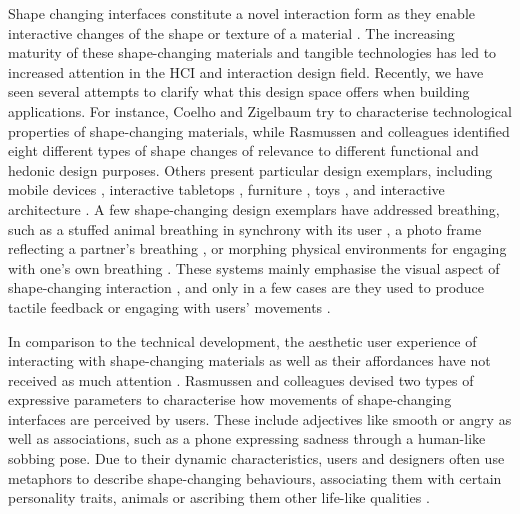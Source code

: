 Shape changing interfaces constitute a novel interaction form as they enable interactive changes of the shape or texture of a material \cite{alexander_grand_2018}. The increasing maturity of these shape-changing materials and tangible technologies has led to increased attention in the HCI and interaction design field. Recently, we have seen several attempts to clarify what this design space offers when building applications. For instance, Coelho and Zigelbaum \cite{coelho_shape-changing_2011} try to characterise technological properties of shape-changing materials, while Rasmussen and colleagues \cite{rasmussen_shape-changing_2012} identified eight different types of shape changes of relevance to different functional and hedonic design purposes. Others present particular design exemplars, including mobile devices \cite{hemmert_shape-changing_2010, dimitriadis_evaluating_2014, gomes_morephone_2013}, interactive tabletops \cite{follmer_inform_2013, taher_exploring_2015}, furniture \cite{gronvall_causing_2014}, toys \cite{katsumoto_ninja_2013}, and interactive architecture \cite{oosterhuis_interactions_2008}. A few shape-changing design exemplars have addressed breathing, such as a stuffed animal breathing in synchrony with its user \cite{aslan_hold_2016}, a photo frame  reflecting a partner's breathing \cite{kim_breathingframe_2015}, or morphing physical environments for engaging with one's own breathing \cite{sjoman_breathing_2018, schnadelbach_exobuilding_2012}. These systems mainly emphasise the visual aspect of shape-changing interaction \cite{kim_breathingframe_2015, sjoman_breathing_2018, schnadelbach_exobuilding_2012, moran_exopranayama_2016}, and only in a few cases are they used to produce tactile feedback \cite{yu_breathe_2015} or engaging with users' movements \cite{tomimatsu_breathing_2016}.

In comparison to the technical development, the aesthetic user experience of interacting with shape-changing materials as well as their affordances have not received as much attention \cite{rasmussen_shape-changing_2012, alexander_grand_2018}. Rasmussen and colleagues \cite{rasmussen_shape-changing_2012} devised two types of expressive parameters to characterise how movements of shape-changing interfaces are perceived by users. These include adjectives like smooth or angry as well as associations, such as a phone expressing sadness through a human-like sobbing pose. Due to their dynamic characteristics, users and designers often use metaphors to describe shape-changing behaviours, associating them with certain personality traits, animals or ascribing them other life-like qualities \cite{rasmussen_sketching_2016, kwak_design_2014}.


